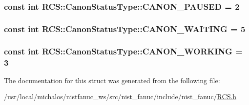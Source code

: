 \hypertarget{structRCS_1_1CanonStatusType_a3512fd4fa863e04ee26a8adbb52d0690}{
\subsubsection[{C\-A\-N\-O\-N\-\_\-\-P\-A\-U\-S\-E\-D}]{\setlength{\rightskip}{0pt plus 5cm}const int R\-C\-S\-::\-Canon\-Status\-Type\-::\-C\-A\-N\-O\-N\-\_\-\-P\-A\-U\-S\-E\-D = 2\hspace{0.3cm}{\ttfamily [static]}}}\label{structRCS_1_1CanonStatusType_a3512fd4fa863e04ee26a8adbb52d0690}
\hypertarget{structRCS_1_1CanonStatusType_aeb8aba3e3d0d2acb005e9716cd013b5a}{
\subsubsection[{C\-A\-N\-O\-N\-\_\-\-W\-A\-I\-T\-I\-N\-G}]{\setlength{\rightskip}{0pt plus 5cm}const int R\-C\-S\-::\-Canon\-Status\-Type\-::\-C\-A\-N\-O\-N\-\_\-\-W\-A\-I\-T\-I\-N\-G = 5\hspace{0.3cm}{\ttfamily [static]}}}\label{structRCS_1_1CanonStatusType_aeb8aba3e3d0d2acb005e9716cd013b5a}
\hypertarget{structRCS_1_1CanonStatusType_a81ac63b3c72df61debaa8303a07aed8f}{
\subsubsection[{C\-A\-N\-O\-N\-\_\-\-W\-O\-R\-K\-I\-N\-G}]{\setlength{\rightskip}{0pt plus 5cm}const int R\-C\-S\-::\-Canon\-Status\-Type\-::\-C\-A\-N\-O\-N\-\_\-\-W\-O\-R\-K\-I\-N\-G = 3\hspace{0.3cm}{\ttfamily [static]}}}\label{structRCS_1_1CanonStatusType_a81ac63b3c72df61debaa8303a07aed8f}


The documentation for this struct was generated from the following file\-:\begin{DoxyCompactItemize}
\item 
/usr/local/michalos/nistfanuc\-\_\-ws/src/nist\-\_\-fanuc/include/nist\-\_\-fanuc/\hyperlink{RCS_8h}{R\-C\-S.\-h}\end{DoxyCompactItemize}
